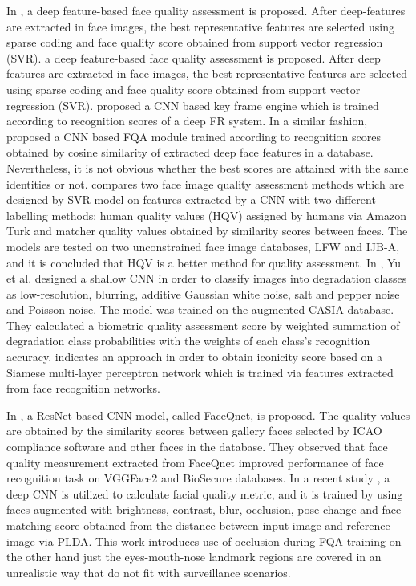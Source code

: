 \documentclass[runningheads]{llncs}
\begin{document}
In \cite{Li2016ImgQ}, a deep feature-based face quality assessment is proposed. After deep-features are extracted in face images, the best representative features are selected using sparse coding and face quality score obtained from support vector regression (SVR). \cite{Khastavaneh2017FaceIQ}  a deep feature-based face quality assessment is proposed. After deep features are extracted in face images, the best representative features are selected using sparse coding and face quality score obtained from support vector regression (SVR). \cite{QiCNN} proposed a CNN based key frame engine which is trained according to recognition scores of a deep FR system. In a similar fashion, \cite{QiBoost} proposed a CNN based FQA module trained according to recognition scores obtained by cosine similarity of extracted deep face features in a database. Nevertheless, it is not obvious whether the best scores are attained with the same identities or not. \cite{Best-Rowden}compares two face image quality assessment methods which are designed by SVR model on features extracted by a CNN with two different labelling methods: human quality values (HQV) assigned by humans via Amazon Turk and matcher quality values obtained by similarity scores between faces. The models are tested on two unconstrained face image databases, LFW and IJB-A, and it is concluded that HQV is a better method for quality assessment. In \cite{YuFace}, Yu et al. designed a shallow CNN in order to classify images into degradation classes as low-resolution, blurring, additive Gaussian white noise, salt and pepper noise and Poisson noise. The model was trained on the augmented CASIA database. They calculated a biometric quality assessment score by weighted summation of degradation class probabilities with the weights of each class’s recognition accuracy. \cite{Dhar} indicates an approach in order to obtain iconicity score based on a Siamese multi-layer perceptron network which is trained via features extracted from face recognition networks. 

In \cite{HernandezOrtega2019}, a ResNet-based CNN model, called FaceQnet, is proposed. The quality values are obtained by the similarity scores between gallery faces selected by ICAO compliance software and other faces in the database. They observed that face quality measurement extracted from FaceQnet improved performance of face recognition task on VGGFace2 and BioSecure databases. In a recent study \cite{RecOrFQ19}, a deep CNN is utilized to calculate facial quality metric, and it is trained by using faces augmented with brightness, contrast, blur, occlusion, pose change and face matching score obtained from the distance between input image and reference image via PLDA. This work introduces use of occlusion during FQA training on the other hand just the eyes-mouth-nose landmark regions are covered in an unrealistic way that do not fit with surveillance scenarios. 
\end{document}
